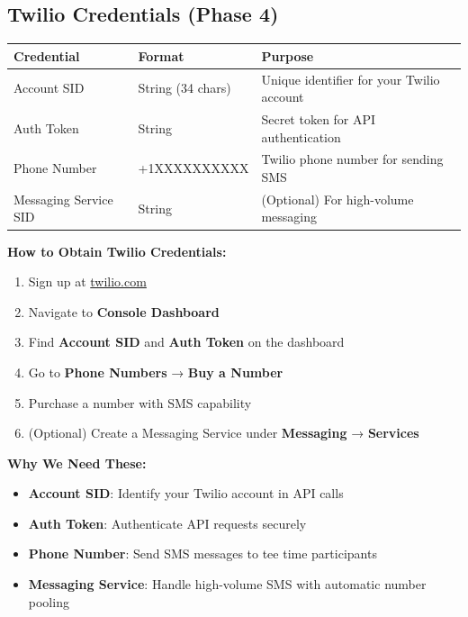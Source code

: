 \documentclass[11pt,a4paper]{article}
\begin{document}
\subsection{Twilio Credentials (Phase 4)}

\begin{tabularx}{\textwidth}{|p{4cm}|p{3cm}|Y|}
\hline
{}
\textbf{Credential} & \textbf{Format} & \textbf{Purpose} \\
\hline
Account SID & String (34 chars) & Unique identifier for your Twilio account \\
\hline
Auth Token & String & Secret token for API authentication \\
\hline
Phone Number & +1XXXXXXXXXX & Twilio phone number for sending SMS \\
\hline
Messaging Service SID & String & (Optional) For high-volume messaging \\
\hline
\end{tabularx}

\vspace{0.3cm}
\textbf{How to Obtain Twilio Credentials:}
\begin{enumerate}[label=\arabic*.]
\item Sign up at \href{https://www.twilio.com}{twilio.com}
\item Navigate to \textbf{Console Dashboard}
\item Find \textbf{Account SID} and \textbf{Auth Token} on the dashboard
\item Go to \textbf{Phone Numbers} → \textbf{Buy a Number}
\item Purchase a number with SMS capability
\item (Optional) Create a Messaging Service under \textbf{Messaging} → \textbf{Services}
\end{enumerate}

\vspace{0.3cm}
\textbf{Why We Need These:}
\begin{itemize}[label=\faCheckCircle]
\item \textbf{Account SID}: Identify your Twilio account in API calls
\item \textbf{Auth Token}: Authenticate API requests securely
\item \textbf{Phone Number}: Send SMS messages to tee time participants
\item \textbf{Messaging Service}: Handle high-volume SMS with automatic number pooling
\end{itemize}
\end{document}
